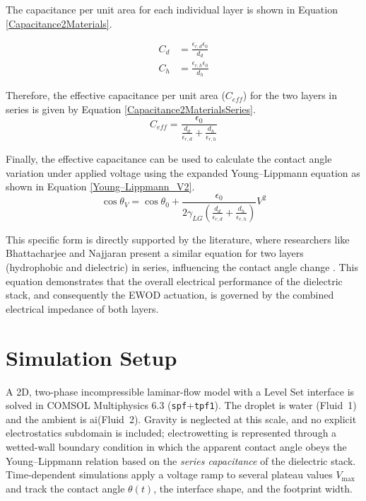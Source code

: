 \documentclass[9pt,a4paper,twocolumn,twoside]{tau-class/tau}
\begin{document}
The capacitance per unit area for each individual layer is shown in Equation \ref{Capacitance2Materials}.

\begin{equation}
\begin{aligned}
\label{Capacitance2Materials}
C_{d} &= \frac{\epsilon_{r,d}\epsilon_{0}}{d_d} \\
C_{h} &= \frac{\epsilon_{r,h}\epsilon_{0}}{d_h}
\end{aligned}
\end{equation}

Therefore, the effective capacitance per unit area ($C_{eff}$) for the two layers in series is given by Equation \ref{Capacitance2MaterialsSeries}.
\begin{equation}
\label{Capacitance2MaterialsSeries}
 C_{eff} = \frac{\epsilon_0}{\frac{d_d}{\epsilon_{r,d}} + \frac{d_h}{\epsilon_{r,h}}}
\end{equation}

Finally, the effective capacitance can be used to calculate the contact angle variation under applied voltage using the expanded Young–Lippmann equation as shown in Equation \ref{Young–Lippmann_V2}.
\begin{equation}
\label{Young–Lippmann_V2}
\cos \theta_{V} = \cos \theta_{0} + \frac{\epsilon_{0}}{2\gamma_{LG} \left(\frac{d_{d}}{\epsilon_{r,d}} + \frac{d_{h}}{\epsilon_{r,h}}\right)} V^{2}
\end{equation}

This specific form is directly supported by the literature, where researchers like Bhattacharjee and Najjaran present a similar equation for two layers (hydrophobic and dielectric) in series, influencing the contact angle change \cite{bhattacharjeeDropletPositionControl2010}. This equation demonstrates that the overall electrical performance of the dielectric stack, and consequently the EWOD actuation, is governed by the combined electrical impedance of both layers.

\section{Simulation Setup}

A 2D, two-phase incompressible laminar-flow model with a Level Set interface is solved in COMSOL Multiphysics 6.3 (\texttt{spf}+\texttt{tpf1}). The droplet is water (Fluid~1) and the ambient is ai(Fluid~2). Gravity is neglected at this scale, and no explicit electrostatics subdomain is included; electrowetting is represented through a wetted-wall boundary condition in which the apparent contact angle
obeys the Young–Lippmann relation based on the \emph{series capacitance} of the dielectric stack. Time-dependent simulations apply a voltage ramp to several plateau values $V_{\max}$ and track the contact angle $\theta(t)$, the interface shape, and the footprint width.
\end{document}
